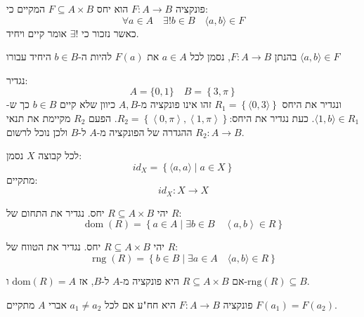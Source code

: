 \documentclass{tstextbook}
\begin{document}
\begin{definition}[פונקציה]
פונקציה \(F:A\to B\) הוא יחס \(F\subseteq A\times B\) המקיים כי:
$$\forall a \in A\quad \exists! b\in B\quad \langle a, b \rangle \in F$$
כאשר נזכור כי \(\exists!\) אומר קיים ויחיד.

\end{definition}
\begin{definition}
בהנתן \(F:A\to B\), נסמן לכל \(a \in A\) את \(F(a)\) להיות ה-\(b \in B\) היחיד עבורו \(\langle a, b \rangle\in F\)

\end{definition}
\begin{example}
נגדיר:
$$A=\{ 0,1 \}\quad B=\left\{  3,\pi  \right\}$$
ונגדיר את היחס \(R_{1}=\left\{  \langle 0, 3 \rangle   \right\}\)
זהו אינו פונקציה מ-\(A,B\) כיוון שלא קיים \(b \in B\) כך ש-\(\langle 1, b \rangle\in R_{1}\).
כעת נגדיר את היחס:\(R_{2}=\left\{  \left\langle  0, \pi  \right\rangle ,\left\langle  1,\pi   \right\rangle   \right\}\). הפעם \(R_{2}\) מקיימת את תנאי ההגדרה של הפונקציה מ-\(A\) ל-\(B\) ולכן נוכל לרשום \(R_{2}:A\to B\).

\end{example}
\begin{definition}
לכל קבוצה \(X\) נסמן:
$$id_{X}=\left\{  \langle a,a \rangle \mid a\in X  \right\}$$
מתקיים:
$$id_{X}:X\to X$$

\end{definition}
\begin{definition}[תחום]
יהי \(R\subseteq A\times B\) יחס. נגדיר את התחום של \(R\):
$$\operatorname{dom}\left(R\right)=\left\{a\in A\mid\exists b\in B\quad\left\langle a,b\right\rangle\in R\right\}$$

\end{definition}
\begin{definition}[טווח]
יהי \(R\subseteq A\times B\) יחס. נגדיר את הטווח של \(R\):
$$\operatorname{rng}\left(R\right)=\left\{b\in B\mid\exists a\in A\quad\langle a,b\rangle\in R\right\}$$

\end{definition}
\begin{remark}
אם \(R\subseteq A\times B\) היא פונקציה מ-\(A\) ל-\(B\), אז \(\mathrm{dom}(R)=A\) ו-\(\mathrm{rng}(R)\subseteq B\).

\end{remark}
\begin{definition}[חח"ע]
פונקציה \(F:A\to B\) היא חח"ע אם לכל \(a_{1}\neq a_{2}\) אברי \(A\) מתקיים \(F(a_{1})=F(a_{2})\).

\end{definition}
\end{document}
